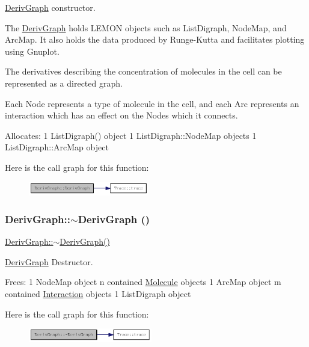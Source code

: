 \hyperlink{classDerivGraph}{DerivGraph} constructor.

The \hyperlink{classDerivGraph}{DerivGraph} holds LEMON objects such as ListDigraph, NodeMap, and ArcMap. It also holds the data produced by Runge-\/Kutta and facilitates plotting using Gnuplot.

The derivatives describing the concentration of molecules in the cell can be represented as a directed graph.

Each Node represents a type of molecule in the cell, and each Arc represents an interaction which has an effect on the Nodes which it connects.

Allocates: 1 ListDigraph() object 1 ListDigraph::NodeMap objects 1 ListDigraph::ArcMap object 

Here is the call graph for this function:\nopagebreak
\begin{figure}[H]
\begin{center}
\leavevmode
\includegraphics[width=149pt]{classDerivGraph_af2a1f80b96b4657e7575748942d09947_cgraph}
\end{center}
\end{figure}
\hypertarget{classDerivGraph_a27b4fed56f8d2a745582622b7cb78b50}{
\subsubsection[{$\sim$DerivGraph}]{\setlength{\rightskip}{0pt plus 5cm}DerivGraph::$\sim$DerivGraph ()}}
\label{classDerivGraph_a27b4fed56f8d2a745582622b7cb78b50}
\hyperlink{classDerivGraph_a27b4fed56f8d2a745582622b7cb78b50}{DerivGraph::$\sim$DerivGraph()}

\hyperlink{classDerivGraph}{DerivGraph} Destructor.

Frees: 1 NodeMap object n contained \hyperlink{classMolecule}{Molecule} objects 1 ArcMap object m contained \hyperlink{classInteraction}{Interaction} objects 1 ListDigraph object 

Here is the call graph for this function:\nopagebreak
\begin{figure}[H]
\begin{center}
\leavevmode
\includegraphics[width=153pt]{classDerivGraph_a27b4fed56f8d2a745582622b7cb78b50_cgraph}
\end{center}
\end{figure}


